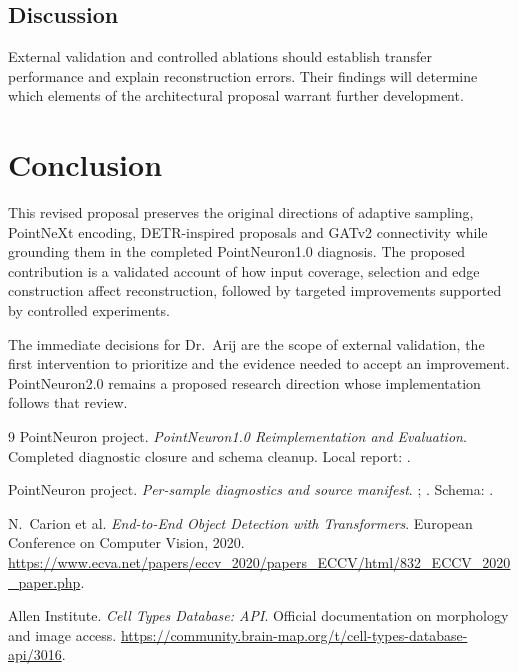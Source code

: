 \documentclass[11pt,a4paper]{article}
\begin{document}
\subsection{Discussion}
External validation and controlled ablations should establish transfer performance and explain reconstruction errors. Their findings will determine which elements of the architectural proposal warrant further development.

\section{Conclusion}
This revised proposal preserves the original directions of adaptive sampling, PointNeXt encoding, DETR-inspired proposals and GATv2 connectivity while grounding them in the completed PointNeuron1.0 diagnosis. The proposed contribution is a validated account of how input coverage, selection and edge construction affect reconstruction, followed by targeted improvements supported by controlled experiments.

The immediate decisions for Dr.~Arij are the scope of external validation, the first intervention to prioritize and the evidence needed to accept an improvement. PointNeuron2.0 remains a proposed research direction whose implementation follows that review.

\begin{thebibliography}{9}
PointNeuron project. \emph{PointNeuron1.0 Reimplementation and Evaluation}.
Completed diagnostic closure and schema cleanup.
Local report: .

PointNeuron project. \emph{Per-sample diagnostics and source manifest}.
;
.
Schema: .

N.~Carion et al. \emph{End-to-End Object Detection with Transformers}.
European Conference on Computer Vision, 2020.
\url{https://www.ecva.net/papers/eccv_2020/papers_ECCV/html/832_ECCV_2020_paper.php}.

Allen Institute. \emph{Cell Types Database: API}.
Official documentation on morphology and image access.
\url{https://community.brain-map.org/t/cell-types-database-api/3016}.
\end{thebibliography}
\end{document}
